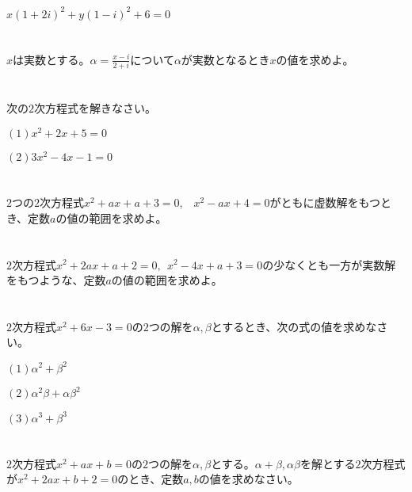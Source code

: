 \documentclass[twocolumn, 20pt]{jarticle}
\begin{document}
$ x(1+2i)^2 + y(1-i)^2 + 6 = 0$
\vspace{-0.5cm}
\section{}
$x$は実数とする。$\displaystyle \alpha = \frac{x-i}{2+i}$について$\displaystyle \alpha$が実数となるとき$x$の値を求めよ。

\vspace{-0.5cm}
\section{}

次の$2$次方程式を解きなさい。

$\displaystyle (1)x^2 + 2x + 5=0$

$\displaystyle(2) 3x^2 - 4x -1 =0$
\vspace{-0.5cm}
\section{}

$2$つの$2$次方程式$x^2 + ax +a +3 =0$,\ \ $x^2 -ax + 4 = 0$がともに虚数解をもつとき、定数$a$の値の範囲を求めよ。
\vspace{-0.5cm}
\section{}

$2$次方程式$x^2 + 2ax + a +2 = 0,\ \ x^2 -4x + a + 3=0$の少なくとも一方が実数解をもつような、定数$a$の値の範囲を求めよ。
\vspace{-0.5cm}
\section{}

$2$次方程式$x^2 + 6x -3 = 0$の$2$つの解を$\alpha,\beta$とするとき、次の式の値を求めなさい。

$\displaystyle (1) \alpha^2 + \beta^2$

$\displaystyle (2) \alpha^2\beta + \alpha\beta^2$

$\displaystyle (3) \alpha^3 + \beta^3$

\vspace{-0.5cm}
\section{}
$2$次方程式$x^2 + ax + b=0$の$2$つの解を$\alpha,\beta$とする。$\alpha+\beta,\alpha\beta$を解とする$2$次方程式が$x^2 + 2ax + b + 2=0$のとき、定数$a,b$の値を求めなさい。
\end{document}
